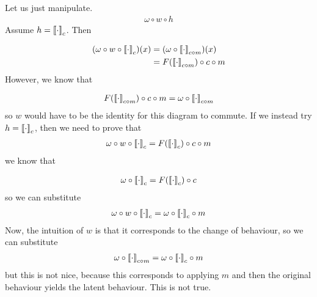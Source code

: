 \newpage
Let us just manipulate. 
\begin{align}
    \omega \circ w \circ h 
\end{align}  
Assume $h={{\llbracket\cdot\rrbracket}}_{c}$. Then

\begin{align}
    (\omega \circ w \circ {{\llbracket\cdot\rrbracket}}_{c})(x) &=
    (\omega \circ {{\llbracket\cdot\rrbracket}}_{c\circ m })(x)\\
    &= F({{\llbracket\cdot\rrbracket}}_{c\circ m })\circ c \circ m\\
\end{align} 
\newpage
However, we know that 

\begin{align}
    F({{\llbracket\cdot\rrbracket}}_{c\circ m})\circ c\circ m =\omega \circ {{\llbracket\cdot\rrbracket}}_{c\circ m}
\end{align} 
so $w$ would have to be the identity for this diagram to commute. If we instead try $h={{\llbracket\cdot\rrbracket}}_{c}$, then we need to prove that 
\begin{align}
    \omega \circ w \circ {{\llbracket\cdot\rrbracket}}_{c} = F({{\llbracket\cdot\rrbracket}}_{c})\circ c\circ m
\end{align} 
we know that

\begin{align}
    \omega \circ {{\llbracket\cdot\rrbracket}}_{c} = F({{\llbracket\cdot\rrbracket}}_{c})\circ c
\end{align} 
so we can substitute
\begin{align}
    \omega \circ w \circ {{\llbracket\cdot\rrbracket}}_{c} = \omega \circ {{\llbracket\cdot\rrbracket}}_{c} \circ m
\end{align} 
Now, the intuition of $w$ is that it corresponds to the change of behaviour, so we can substitute
\begin{align}
    \omega \circ {{\llbracket\cdot\rrbracket}}_{c\circ m} = \omega \circ {{\llbracket\cdot\rrbracket}}_{c} \circ m
\end{align} 
but this is not nice, because this corresponds to applying $m$ and then the original behaviour yields the latent behaviour. This is not true. 


